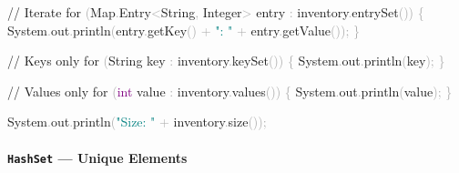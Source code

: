 \documentclass[
  justified,
  openright,
]{tufte-book}
\let\subsubsection\paragraph
\let\paragraph\paragraph
\newcommand{\BuiltInTok}[1]{#1}
\newcommand{\CommentTok}[1]{\textcolor{MidGray}{#1}}
\newcommand{\ControlFlowTok}[1]{\textcolor{BrandBlue}{#1}}
\newcommand{\DataTypeTok}[1]{\textcolor{Purple}{#1}}
\newcommand{\FunctionTok}[1]{\textcolor{BrandBlue}{#1}}
\newcommand{\NormalTok}[1]{#1}
\newcommand{\OperatorTok}[1]{\textcolor{DarkGray}{#1}}
\newcommand{\StringTok}[1]{\textcolor{Teal}{#1}}
\newenvironment{Shaded}{%
  \begin{snugshade}
}{%
  \end{snugshade}
}
\let\subsubsection\paragraph
\let\paragraph\paragraph
\begin{document}
\begin{Shaded}
\begin{Highlighting}[]
\CommentTok{// Iterate}
\ControlFlowTok{for} \OperatorTok{(}\BuiltInTok{Map}\OperatorTok{.}\FunctionTok{Entry}\OperatorTok{\textless{}}\BuiltInTok{String}\OperatorTok{,} \BuiltInTok{Integer}\OperatorTok{\textgreater{}}\NormalTok{ entry }\OperatorTok{:}\NormalTok{ inventory}\OperatorTok{.}\FunctionTok{entrySet}\OperatorTok{())} \OperatorTok{\{}
    \BuiltInTok{System}\OperatorTok{.}\FunctionTok{out}\OperatorTok{.}\FunctionTok{println}\OperatorTok{(}\NormalTok{entry}\OperatorTok{.}\FunctionTok{getKey}\OperatorTok{()} \OperatorTok{+} \StringTok{": "} \OperatorTok{+}\NormalTok{ entry}\OperatorTok{.}\FunctionTok{getValue}\OperatorTok{());}
\OperatorTok{\}}

\CommentTok{// Keys only}
\ControlFlowTok{for} \OperatorTok{(}\BuiltInTok{String}\NormalTok{ key }\OperatorTok{:}\NormalTok{ inventory}\OperatorTok{.}\FunctionTok{keySet}\OperatorTok{())} \OperatorTok{\{}
    \BuiltInTok{System}\OperatorTok{.}\FunctionTok{out}\OperatorTok{.}\FunctionTok{println}\OperatorTok{(}\NormalTok{key}\OperatorTok{);}
\OperatorTok{\}}

\CommentTok{// Values only}
\ControlFlowTok{for} \OperatorTok{(}\DataTypeTok{int}\NormalTok{ value }\OperatorTok{:}\NormalTok{ inventory}\OperatorTok{.}\FunctionTok{values}\OperatorTok{())} \OperatorTok{\{}
    \BuiltInTok{System}\OperatorTok{.}\FunctionTok{out}\OperatorTok{.}\FunctionTok{println}\OperatorTok{(}\NormalTok{value}\OperatorTok{);}
\OperatorTok{\}}

\BuiltInTok{System}\OperatorTok{.}\FunctionTok{out}\OperatorTok{.}\FunctionTok{println}\OperatorTok{(}\StringTok{"Size: "} \OperatorTok{+}\NormalTok{ inventory}\OperatorTok{.}\FunctionTok{size}\OperatorTok{());}
\end{Highlighting}
\end{Shaded}

\subsubsection{\texorpdfstring{\texttt{HashSet} --- Unique
Elements}{HashSet --- Unique Elements}}\label{hashset-unique-elements}
\end{document}
